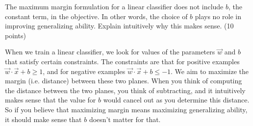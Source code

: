 \documentclass[fleqn]{homework}
\begin{document}
  \begin{problem}{5}
    \begin{question}
      The maximum margin formulation for a linear classifier does not include
      $b$, the constant term, in the objective.  In other words, the choice of
      $b$ plays no role in improving generalizing ability.  Explain intuitively
      why this makes sense. (10 points)
    \end{question}

    When we train a linear classifier, we look for values of the parameters
    $\vec{w}$ and $b$ that satisfy certain constraints.  The constraints are
    that for positive examples $\vec{w}\cdot\vec{x} + b \ge 1$, and for negative
    examples $\vec{w}\cdot\vec{x} + b \le -1$.  We aim to maximize the margin
    (i.e. distance) between these two planes.  When you think of computing the
    distance between the two planes, you think of subtracting, and it
    intuitively makes sense that the value for $b$ would cancel out as you
    determine this distance.  So if you believe that maximizing margin means
    maximizing generalizing ability, it should make sense that $b$ doesn't
    matter for that.
 \end{problem}
\end{document}
